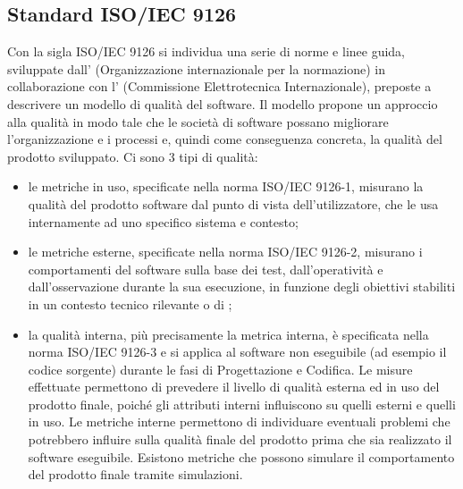 
\subsection{Standard ISO/IEC 9126} %

Con la sigla ISO/IEC 9126 si individua una serie di norme e linee guida, sviluppate dall' (Organizzazione internazionale per la normazione) in collaborazione con l' (Commissione Elettrotecnica Internazionale), preposte a descrivere un modello di qualità del software. Il modello propone un approccio alla qualità in modo tale che le società di software possano migliorare l'organizzazione e i processi e, quindi come conseguenza concreta, la qualità del prodotto sviluppato. Ci sono 3 tipi di qualità:
\begin{itemize}
\item {} le metriche in uso, specificate nella norma ISO/IEC 9126-1, misurano la qualità del prodotto software dal punto di vista dell'utilizzatore, che le usa internamente ad uno specifico sistema e contesto;
\end{itemize}
\begin{itemize}
\item {} le metriche esterne, specificate nella norma ISO/IEC 9126-2, misurano i comportamenti del software sulla base dei test, dall'operatività e dall'osservazione durante la sua esecuzione, in funzione degli obiettivi stabiliti in un contesto tecnico rilevante o di ;
\end{itemize}
\begin{itemize}
\item {} la qualità interna, più precisamente la metrica interna, è specificata nella norma ISO/IEC 9126-3 e si applica al software non eseguibile (ad esempio il codice sorgente) durante le fasi di Progettazione e Codifica. Le misure effettuate permettono di prevedere il livello di qualità esterna ed in uso del prodotto finale, poiché gli attributi interni influiscono su quelli esterni e quelli in uso. Le metriche interne permettono di individuare eventuali problemi che potrebbero influire sulla qualità finale del prodotto prima che sia realizzato il software eseguibile. Esistono metriche che possono simulare il comportamento del prodotto finale tramite simulazioni.
\end{itemize}


